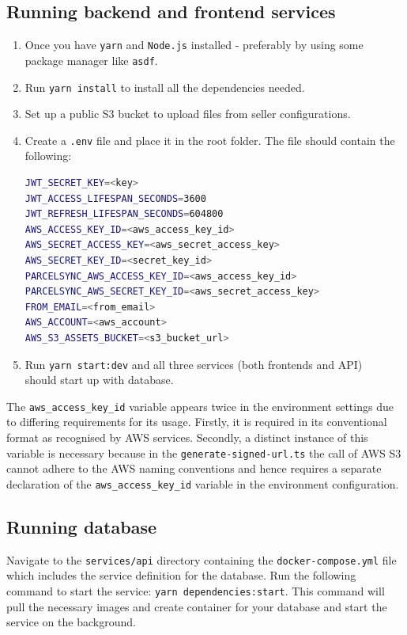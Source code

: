 \subsection{Running backend and frontend services}
\begin{enumerate}
    \item Once you have \texttt{yarn} and \texttt{Node.js} installed - preferably by using some package manager like \texttt{asdf}.
    \item Run \texttt{yarn install} to install all the dependencies needed.
    \item Set up a public S3 bucket to upload files from seller configurations. 
    \item Create a \texttt{.env} file and place it in the root folder. The file should contain the following:
\begin{lstlisting}[language=bash,caption={Platform local environment configuration}]
JWT_SECRET_KEY=<key>
JWT_ACCESS_LIFESPAN_SECONDS=3600
JWT_REFRESH_LIFESPAN_SECONDS=604800
AWS_ACCESS_KEY_ID=<aws_access_key_id>
AWS_SECRET_ACCESS_KEY=<aws_secret_access_key>
AWS_SECRET_KEY_ID=<secret_key_id>
PARCELSYNC_AWS_ACCESS_KEY_ID=<aws_access_key_id>
PARCELSYNC_AWS_SECRET_KEY_ID=<aws_secret_access_key>
FROM_EMAIL=<from_email>
AWS_ACCOUNT=<aws_account>
AWS_S3_ASSETS_BUCKET=<s3_bucket_url>
\end{lstlisting}
    \item Run \texttt{yarn start:dev} and all three services (both frontends and API) \\should start up with database.
\end{enumerate}
The \texttt{aws\_access\_key\_id} variable appears twice in the environment settings due to differing requirements for its usage. Firstly, it is required in its conventional format as recognised by AWS services. 
Secondly, a distinct instance of this variable is necessary because in the \texttt{generate-signed-url.ts} the call of AWS S3 cannot adhere to the AWS naming conventions and hence requires a separate declaration of the \texttt{aws\_access\_key\_id} variable in the environment configuration.


\subsection{Running database}
Navigate to the \texttt{services/api} directory containing the \texttt{docker-compose.yml} file which includes the service definition for the database.
Run the following command to start the service:
\texttt{yarn dependencies:start}.
This command will pull the necessary images and create container for your database and start the service on the background.
    

